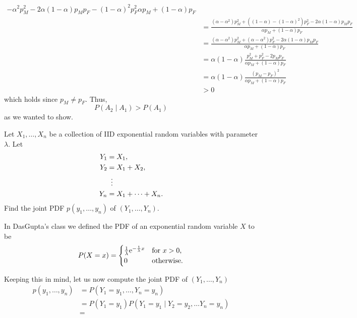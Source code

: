 \begin{solution*}
\begin{align*}
{      -\alpha^2p_M^2-2\alpha(1-\alpha)p_Mp_F
      -(1-\alpha)^2p_F^2}{\alpha p_M+(1-\alpha)p_F}\\
    &=\frac{(\alpha-\alpha^2)p_M^2+((1-\alpha)-(1-\alpha)^2)p_F^2-2\alpha(1-\alpha)p_Mp_F}
      {\alpha p_M+(1-\alpha)p_F}\\
    &=\frac{(\alpha-\alpha^2)p_M^2+(\alpha-\alpha^2)p_F^2-2\alpha(1-\alpha)p_Mp_F}
      {\alpha p_M+(1-\alpha)p_F}\\
    &=\alpha(1-\alpha)\frac{p_M^2+p_F^2-2p_Mp_F}{\alpha
      p_M+(1-\alpha)p_F}\\
    &=\alpha(1-\alpha)\frac{(p_M-p_F)^2}{\alpha
      p_M+(1-\alpha)p_F}\\
    &>0
  \end{align*}
  which holds since \(p_M\neq p_F\). Thus,
  \[
    P(A_2\mid A_1)>P(A_1)
  \]
  as we wanted to show.
\end{solution*}

\begin{problem}
  Let \(X_1,\dotsc,X_n\) be a collection of IID exponential random
  variables with parameter \(\lambda\). Let
  \begin{align*}
    Y_1&=X_1,\\
    Y_2&=X_1+X_2,\\
       &\vdotswithin{{}={}}\\
    Y_n&=X_1+\dotsb+X_n.
  \end{align*}
  Find the joint PDF \(p(y_1,\dotsc,y_n)\) of \((Y_1,\dotsc,Y_n)\).
\end{problem}
\begin{solution*}
  In DasGupta's class we defined the PDF of an exponential random variable
  \(X\) to be
  \[
    P(X=x)=
    \begin{cases}
      \tfrac{1}{\lambda}\mathrm{e}^{-\frac{1}{\lambda}x}&\text{for \(x>0\),}\\
      0&\text{otherwise.}
    \end{cases}
  \]

  Keeping this in mind, let us now compute the joint PDF of
  \((Y_1,\dotsc,Y_n)\)
  \begin{equation}
    \label{eq:yip:mid-2:3}
    \begin{aligned}
      p(y_1,\dotsc,y_n)
      &=P(Y_1=y_1,\dotsc,Y_n=y_n)\\
      &=P(Y_1=y_1)P(Y_1=y_1\mid Y_2=y_2,\dotsc Y_n=y_n)\\
      &=
    \end{aligned}
  \end{equation}
\end{solution*}

